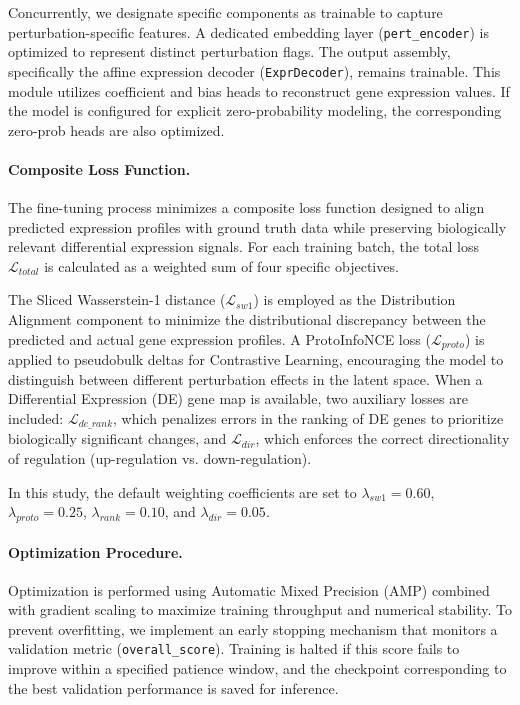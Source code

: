 \documentclass[conference]{IEEEtran}
\begin{document}
Concurrently, we designate specific components as trainable to capture perturbation-specific features. A dedicated embedding layer (\texttt{pert\_encoder}) is optimized to represent distinct perturbation flags. The output assembly, specifically the affine expression decoder (\texttt{ExprDecoder}), remains trainable. This module utilizes coefficient and bias heads to reconstruct gene expression values. If the model is configured for explicit zero-probability modeling, the corresponding zero-prob heads are also optimized.

\paragraph{Composite Loss Function.}
The fine-tuning process minimizes a composite loss function designed to align predicted expression profiles with ground truth data while preserving biologically relevant differential expression signals. For each training batch, the total loss $\mathcal{L}_{total}$ is calculated as a weighted sum of four specific objectives.

The Sliced Wasserstein-1 distance ($\mathcal{L}_{sw1}$) is employed as the Distribution Alignment component to minimize the distributional discrepancy between the predicted and actual gene expression profiles. A ProtoInfoNCE loss ($\mathcal{L}_{proto}$) is applied to pseudobulk deltas for Contrastive Learning, encouraging the model to distinguish between different perturbation effects in the latent space. When a Differential Expression (DE) gene map is available, two auxiliary losses are included: $\mathcal{L}_{de\_rank}$, which penalizes errors in the ranking of DE genes to prioritize biologically significant changes, and $\mathcal{L}_{dir}$, which enforces the correct directionality of regulation (up-regulation vs. down-regulation).

In this study, the default weighting coefficients are set to $\lambda_{sw1}=0.60$, $\lambda_{proto}=0.25$, $\lambda_{rank}=0.10$, and $\lambda_{dir}=0.05$.

\paragraph{Optimization Procedure.}
Optimization is performed using Automatic Mixed Precision (AMP) combined with gradient scaling to maximize training throughput and numerical stability. To prevent overfitting, we implement an early stopping mechanism that monitors a validation metric (\texttt{overall\_score}). Training is halted if this score fails to improve within a specified patience window, and the checkpoint corresponding to the best validation performance is saved for inference.
\end{document}
